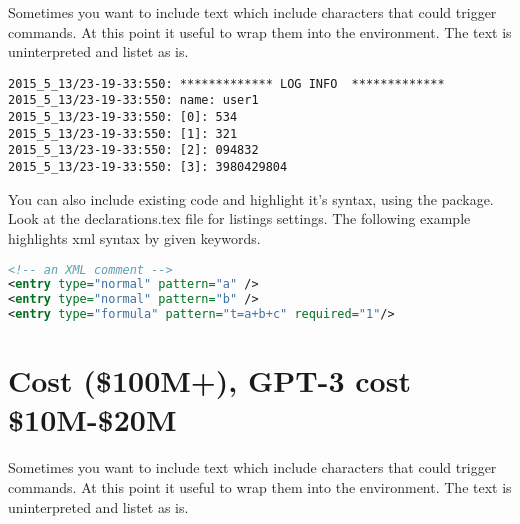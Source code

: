 Sometimes you want to include text which include characters that could trigger commands. At this point it useful to wrap them into the  environment. The text is uninterpreted and listet as is.

\scriptsize
\begin{verbatim}
2015_5_13/23-19-33:550: ************* LOG INFO  *************
2015_5_13/23-19-33:550: name: user1
2015_5_13/23-19-33:550: [0]: 534
2015_5_13/23-19-33:550: [1]: 321
2015_5_13/23-19-33:550: [2]: 094832
2015_5_13/23-19-33:550: [3]: 3980429804
\end{verbatim}
\normalsize	


You can also include existing code and highlight it's syntax, using the  package. Look at the declarations.tex file for listings settings. The following example highlights xml syntax by given keywords.

\small
\begin{lstlisting}[keywordstyle=\color{blue},language=XML]
<!-- an XML comment -->
<entry type="normal" pattern="a" />
<entry type="normal" pattern="b" />
<entry type="formula" pattern="t=a+b+c" required="1"/>
\end{lstlisting}
\normalsize	

\section{Cost (\$100M+), GPT-3 cost \$10M-\$20M}

Sometimes you want to include text which include characters that could trigger commands. At this point it useful to wrap them into the  environment. The text is uninterpreted and listet as is.
